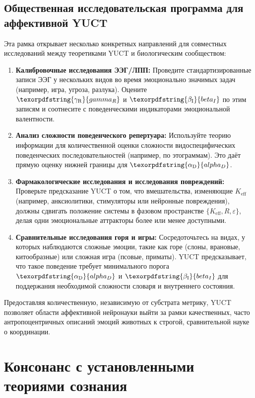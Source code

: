 \documentclass[12pt,a4paper]{article}
\DeclareRobustCommand{\alD}{\texorpdfstring{\ensuremath{\alpha_{\mathrm{D}}}}{alpha_D}}
\DeclareRobustCommand{\beI}{\texorpdfstring{\ensuremath{\beta_{\mathrm{I}}}}{beta_I}}
\DeclareRobustCommand{\gaR}{\texorpdfstring{\ensuremath{\gamma_{\mathrm{R}}}}{gamma_R}}
\begin{document}
	\subsection{Общественная исследовательская программа для аффективной YUCT}
	
	Эта рамка открывает несколько конкретных направлений для совместных исследований между теоретиками YUCT и биологическим сообществом:
	
	\begin{enumerate}
		\item \textbf{Калибровочные исследования ЭЭГ/ЛПП:} Проведите стандартизированные записи ЭЭГ у нескольких видов во время эмоционально значимых задач (например, игра, угроза, разлука). Оцените \(\gaR\) и \(\beI\) по этим записям и соотнесите с поведенческими индикаторами эмоциональной валентности.
		\item \textbf{Анализ сложности поведенческого репертуара:} Используйте теорию информации для количественной оценки сложности видоспецифических поведенческих последовательностей (например, по этограммам). Это даёт прямую оценку нижней границы для \(\alD\).
		\item \textbf{Фармакологические исследования и исследования повреждений:} Проверьте предсказание YUCT о том, что вмешательства, изменяющие \(K_{\mathrm{eff}}\) (например, анксиолитики, стимуляторы или нейронные повреждения), должны сдвигать положение системы в фазовом пространстве \(\{K_{\mathrm{eff}}, R, \varepsilon\}\), делая одни эмоциональные аттракторы более или менее доступными.
		\item \textbf{Сравнительные исследования горя и игры:} Сосредоточьтесь на видах, у которых наблюдаются сложные эмоции, такие как горе (слоны, врановые, китообразные) или сложная игра (псовые, приматы). YUCT предсказывает, что такое поведение требует минимального порога \(\alD\) и \(\beI\) для поддержания необходимой сложности словаря и внутреннего состояния.
	\end{enumerate}
	
	Предоставляя количественную, независимую от субстрата метрику, YUCT позволяет области аффективной нейронауки выйти за рамки качественных, часто антропоцентричных описаний эмоций животных к строгой, сравнительной науке о координации.
	
	\section{Консонанс с установленными теориями сознания}
	
\end{document}
